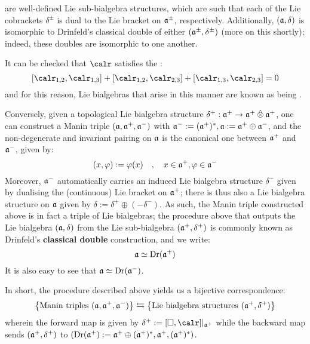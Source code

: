         are well-defined Lie sub-bialgebra structures, which are such that each of the Lie cobrackets $\delta^{\pm}$ is dual to the Lie bracket on $\mathfrak{a}^{\pm}$, respectively. Additionally, $(\mathfrak{a}, \delta)$ is isomorphic to Drinfeld's classical double of either $(\mathfrak{a}^{\pm}, \delta^{\pm})$ (more on this shortly); indeed, these doubles are isomorphic to one another.
        \begin{remark}
            It can be checked that $\calr$ satisfies the :
                \begin{equation} \label{equation: CYBE}
                    [\calr_{1, 2}, \calr_{1, 3}] + [\calr_{1, 2}, \calr_{2, 3}] + [\calr_{1, 3}, \calr_{2, 3}] = 0
                \end{equation}
            and for this reason, Lie bialgebras that arise in this manner are known as being .
        \end{remark}
        
        Conversely, given a topological Lie bialgebra structure $\delta^+: \a^+ \to \a^+ \hattensor \a^+$, one can construct a Manin triple $(\mathfrak{a}, \mathfrak{a}^+, \mathfrak{a}^-)$ with $\mathfrak{a}^- := (\mathfrak{a}^+)^*, \mathfrak{a} := \mathfrak{a}^+ \oplus \mathfrak{a}^-$, and the non-degenerate and invariant pairing on $\mathfrak{a}$ is the canonical one between $\mathfrak{a}^+$ and $\mathfrak{a}^-$, given by:
            $$(x, \varphi) := \varphi(x) \quad, \quad x \in \mathfrak{a}^+, \varphi \in \mathfrak{a}^-$$
        Moreover, $\mathfrak{a}^-$ automatically carries an induced Lie bialgebra structure $\delta^-$ given by dualising the (continuous) Lie bracket on $\mathfrak{a}^+$; there is thus also a Lie bialgebra structure on $\mathfrak{a}$ given by $\delta := \delta^+ \oplus (-\delta^-)$. As such, the Manin triple constructed above is in fact a triple of Lie bialgebras; the procedure above that outputs the Lie bialgebra $(\mathfrak{a}, \delta)$ from the Lie sub-bialgebra $(\mathfrak{a}^+, \delta^+)$ is commonly known as Drinfeld's \textbf{classical double} construction, and we write:
            $$\mathfrak{a} \simeq \operatorname{Dr}(\mathfrak{a}^+)$$
        It is also easy to see that $\mathfrak{a} \simeq \operatorname{Dr}(\mathfrak{a}^-)$.

        In short, the procedure described above yields us a bijective correspondence:
            \begin{equation} \label{equation: manin_triple_lie_bialgebra_correspondence}
                \left\{ \text{Manin triples $(\mathfrak{a}, \mathfrak{a}^+, \mathfrak{a}^-)$} \right\} \leftrightarrows \left\{ \text{Lie bialgebra structures $(\mathfrak{a}^+, \delta^+)$} \right\}
            \end{equation}
        wherein the forward map is given by $\delta^+ := [\Box, \calr]|_{\a^+}$ while the backward map sends $(\mathfrak{a}^+, \delta^+)$ to $(\operatorname{Dr}(\mathfrak{a}^+) := \mathfrak{a}^+ \oplus (\mathfrak{a}^+)^*, \mathfrak{a}^+, (\mathfrak{a}^+)^*)$.

